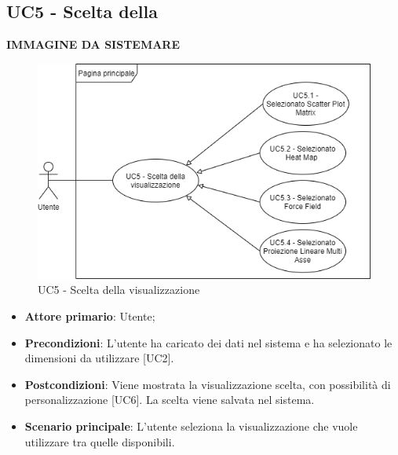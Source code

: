 \subsection{UC5 - Scelta della }
\textbf{IMMAGINE DA SISTEMARE}
\begin{figure}[h]
\includegraphics[width=\linewidth]{Section/Images/UC5.png}
\centering
\caption{UC5 - Scelta della visualizzazione}
\end{figure}
\begin{itemize}
	\item \textbf{Attore primario}: Utente;
	\item \textbf{Precondizioni}: L'utente ha caricato dei dati nel sistema e ha selezionato le dimensioni da utilizzare [UC2].
	\item \textbf{Postcondizioni}: Viene mostrata la visualizzazione scelta, con possibilità di personalizzazione [UC6]. La scelta viene salvata nel sistema.
	\item \textbf{Scenario principale}: L'utente seleziona la visualizzazione che vuole utilizzare tra quelle disponibili.

\end{itemize}